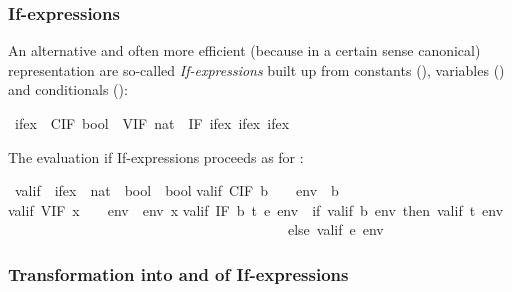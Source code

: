 \begin{isabelle}
\begin{isamarkuptext}
\subsubsection{If-expressions}

An alternative and often more efficient (because in a certain sense
canonical) representation are so-called \emph{If-expressions} built up
from constants (), variables () and conditionals
():%
\end{isamarkuptext}%
\ ifex\ {\isacharequal}\ CIF\ bool\ {\isacharbar}\ VIF\ nat\ {\isacharbar}\ IF\ ifex\ ifex\ ifex%
\begin{isamarkuptext}%
\noindent
The evaluation if If-expressions proceeds as for :%
\end{isamarkuptext}%
\ valif\ {\isacharcolon}{\isacharcolon}\ {\isachardoublequote}ifex\ {\isasymRightarrow}\ {\isacharparenleft}nat\ {\isasymRightarrow}\ bool{\isacharparenright}\ {\isasymRightarrow}\ bool{\isachardoublequote}\isanewline
{}\isanewline
{\isachardoublequote}valif\ {\isacharparenleft}CIF\ b{\isacharparenright}\ \ \ \ env\ {\isacharequal}\ b{\isachardoublequote}\isanewline
{\isachardoublequote}valif\ {\isacharparenleft}VIF\ x{\isacharparenright}\ \ \ \ env\ {\isacharequal}\ env\ x{\isachardoublequote}\isanewline
{\isachardoublequote}valif\ {\isacharparenleft}IF\ b\ t\ e{\isacharparenright}\ env\ {\isacharequal}\ {\isacharparenleft}if\ valif\ b\ env\ then\ valif\ t\ env\isanewline
\ \ \ \ \ \ \ \ \ \ \ \ \ \ \ \ \ \ \ \ \ \ \ \ \ \ \ \ \ \ \ \ \ \ \ \ \ \ \ \ else\ valif\ e\ env{\isacharparenright}{\isachardoublequote}%
\begin{isamarkuptext}%
\subsubsection{Transformation into and of If-expressions}


\end{isamarkuptext}
\end{isabelle}
